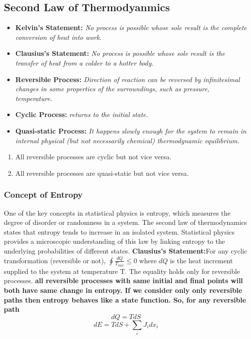 \documentclass{article}
\begin{document}
\subsection{Second Law of Thermodyanmics}
\begin{itemize}
    \item \textbf{Kelvin's Statement:} \textit{No process is possible whose sole result is the complete conversion of heat into work.}
    \item \textbf{Clausius's Statement:} \textit{No process is possible whose sole result is the transfer of heat from a colder to a hotter body.}
    
    \item \textbf{Reversible Process:} \textit{Direction of reaction can be reversed by infinitesimal changes in some properties of the surroundings, such as pressure, temperature.}
    \item \textbf{Cyclic Process:} \textit{returns to the initial state.}
    
    \item \textbf{Quasi-static Process:} \textit{It happens slowly enough for the system to remain in internal physical (but not necessarily chemical)
thermodynamic equilibrium.}


\end{itemize}
\begin{enumerate}
    \item  All reversible processes are cyclic but not vice versa.
    \item All reversible processes are quasi-static but not vice versa.
\end{enumerate}

    


\subsubsection{Concept of Entropy}
One of the key concepts in statistical physics is entropy, which measures the degree of disorder or randomness in a system. The second law of thermodynamics states that entropy tends to increase in an isolated system. Statistical physics provides a microscopic understanding of this law by linking entropy to the underlying probabilities of different states.
\textbf{Clausius's Statement:}For any cyclic transformation (reversible or not), $\oint \frac{{dQ}}{{T_{\text{surr}}}} \leq 0 $ where $dQ$ is the heat increment supplied to the system at temperature T.
The equality holds only for reversible processes. 
\textbf{all reversible processes with same initial and final points will both have same change in entropy. If we consider only only reversible paths then entropy behaves like a state function. So,
for any reversible path}
$$dQ=TdS$$
$$dE = TdS + \sum_{i} J_i dx_i$$
\end{document}
